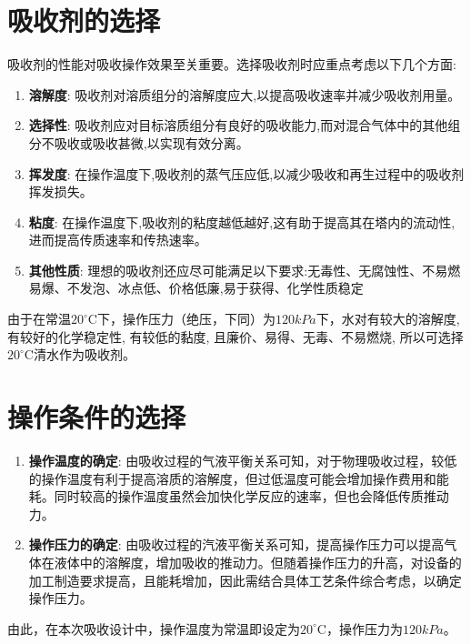 \section{吸收剂的选择}

吸收剂的性能对吸收操作效果至关重要。选择吸收剂时应重点考虑以下几个方面:

\begin{enumerate}
	\item \textbf{溶解度}: 吸收剂对溶质组分的溶解度应大,以提高吸收速率并减少吸收剂用量。
	
	\item \textbf{选择性}: 吸收剂应对目标溶质组分有良好的吸收能力,而对混合气体中的其他组分不吸收或吸收甚微,以实现有效分离。
	
	\item \textbf{挥发度}: 在操作温度下,吸收剂的蒸气压应低,以减少吸收和再生过程中的吸收剂挥发损失。
	
	\item \textbf{粘度}: 在操作温度下,吸收剂的粘度越低越好,这有助于提高其在塔内的流动性,进而提高传质速率和传热速率。
	
	\item \textbf{其他性质}: 理想的吸收剂还应尽可能满足以下要求:无毒性、无腐蚀性、不易燃易爆、不发泡、冰点低、价格低廉,易于获得、化学性质稳定
\end{enumerate}

由于在常温$20^{\circ}$C下，操作压力（绝压，下同）为$120kPa$下，水对有较大的溶解度, 有较好的化学稳定性, 有较低的黏度, 且廉价、易得、无毒、不易燃烧, 所以可选择$20^{\circ}$C清水作为吸收剂。



\section{操作条件的选择}

\begin{enumerate}
	\item \textbf{操作温度的确定}: 由吸收过程的气液平衡关系可知，对于物理吸收过程，较低的操作温度有利于提高溶质的溶解度，但过低温度可能会增加操作费用和能耗。同时较高的操作温度虽然会加快化学反应的速率，但也会降低传质推动力。
	
	\item \textbf{操作压力的确定}: 由吸收过程的汽液平衡关系可知，提高操作压力可以提高气体在液体中的溶解度，增加吸收的推动力。但随着操作压力的升高，对设备的加工制造要求提高，且能耗增加，因此需结合具体工艺条件综合考虑，以确定操作压力。
\end{enumerate}

由此，在本次吸收设计中，操作温度为常温即设定为$20^{\circ}$C，操作压力为$120kPa$。